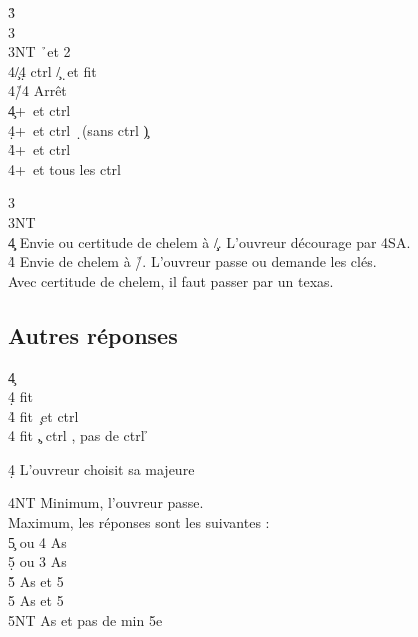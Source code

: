 \documentclass[a4paper]{article}
\begin{document}
\begin{bidtable}
3\h\+\\
3\s {}\s \\
3NT \h\ et 2\s \+\\
4\c/4\d \> ctrl \c /\d\ et fit \h \\
4\h/4\s \> Arrêt\-\\
4\c {}+\s\ et ctrl \c \\
4\d {}+\s\ et ctrl \d\ (sans ctrl \c )\\
4\h {}+\s\ et ctrl \h \\
4\s {}+\s\ et tous les ctrl\-
\end{bidtable}

\begin{bidtable}
3\s\+\\
3NT\+\\
4\c\d \> Envie ou certitude de chelem à \c /\d . L'ouvreur décourage par 4SA.\\
4\h\s \> Envie de chelem à \h /\s . L'ouvreur passe ou demande les clés.\+\\
Avec \> certitude de chelem, il faut passer par un texas.\-\-\-
\end{bidtable}

\subsection{Autres réponses}

\begin{bidtable}
4\c\+\\
4\d \> fit \d \\
4\h \> fit \c\ et ctrl \h \\
4\s \> fit \c , ctrl \s , pas de ctrl \h \-
\end{bidtable}

\begin{bidtable}
4\d \> L'ouvreur choisit sa majeure
\end{bidtable}

\begin{bidtable}
4NT \> Minimum, l'ouvreur passe.\\
\>Maximum, les réponses sont les suivantes :\+\\
5\c {} ou 4 As\\
5\d {} ou 3 As\\
5\h {} As et 5\c \\
5\s {} As et 5\d \\
5NT  As et pas de min 5e\-
\end{bidtable}
\end{document}
